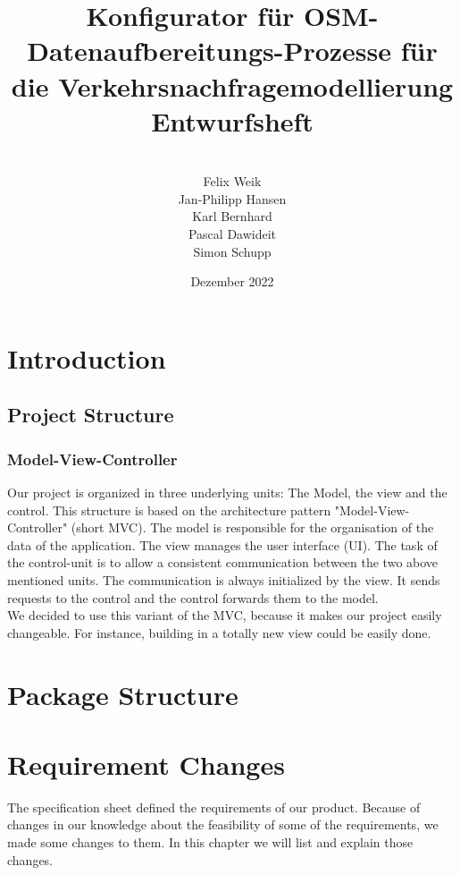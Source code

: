 \documentclass[parskip=full]{scrartcl} %
\title{Konfigurator für OSM-Datenaufbereitungs-Prozesse für die Verkehrsnachfragemodellierung \\ \vspace{2mm}\large{}Entwurfsheft}
\author{
\vspace{5mm}\\
Felix Weik\\ Jan-Philipp Hansen\\ Karl Bernhard\\ Pascal Dawideit\\ Simon Schupp}
\date{Dezember 2022}
\begin{document}
\maketitle
\newpage

\tableofcontents

\newpage

\section{Introduction}
\subsection{Project Structure}
\subsubsection{Model-View-Controller}
Our project is organized in three underlying units: The Model, the view and the control. This structure is based on the architecture pattern "Model-View-Controller" (short MVC). The model is responsible for the organisation of the data of the application. The view manages the user interface (UI). The task of the control-unit is to allow a consistent communication between the two above mentioned units. The communication is always initialized by the view. It sends requests to the control and the control forwards them to the model. \\
We decided to use this variant of the MVC, because it makes our project easily changeable. For instance, building in a totally new view could be easily done.



\newpage

\section{Package Structure}

\newpage

\section{Requirement Changes}
The specification sheet defined the requirements of our product. Because of changes in our knowledge about the feasibility of some of the requirements, we made some changes to them. In this chapter we will list and explain those changes.
\end{document}

